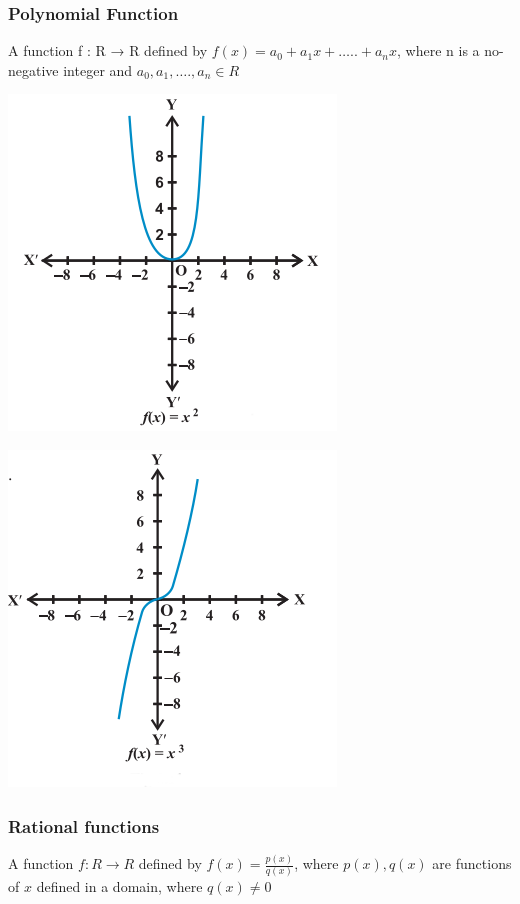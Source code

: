 \documentclass{article}
\begin{document}
\begin{multicols}{2}
 \subsubsection*{Polynomial Function}
 A function f : R → R defined by
$f(x) = a_0 + a_1x + ….. + a_nx$, where n is a no-negative integer and $a_0, a_1, …., a_n \in R$

 \includegraphics[scale=0.5]{4.png}
 
 \includegraphics[scale=0.5]{5.png}

 \subsubsection*{Rational functions}
 A function $f: R \rightarrow R$ defined by $f(x)=\frac{p(x)}{q(x)}$, where $p(x), q(x)$ are functions of $x$ defined in a domain, where $q(x) \not = 0$


\end{multicols}
\end{document}
